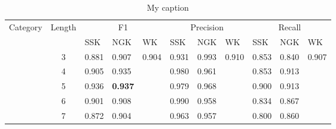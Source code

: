 \begin{table}[]
\centering
\caption{My caption}
\label{my-label}
\begin{tabular}{|c|c|l|l|l|l|l|l|l|l|l|}
\hline
Category                & Length                & \multicolumn{3}{c|}{F1}                                                                                                  & \multicolumn{3}{c|}{Precision} & \multicolumn{3}{c|}{Recall}                                                                   \\ \cline{3-11} 
\multicolumn{1}{|l|}{}  & \multicolumn{1}{l|}{} & SSK                                    & NGK                                    & WK                                     & SSK      & NGK      & WK       & SSK                           & NGK                           & WK                            \\ \hline
                        & 3                     & \cellcolor[HTML]{EFEFEF}0.881          & \cellcolor[HTML]{EFEFEF}0.907          & \cellcolor[HTML]{EFEFEF}0.904	   & 0.931    & 0.993    & 0.910    & \cellcolor[HTML]{EFEFEF}0.853 & \cellcolor[HTML]{EFEFEF}0.840 & \cellcolor[HTML]{EFEFEF}0.907 \\ \cline{2-11} 
                        & 4                     & \cellcolor[HTML]{EFEFEF}0.905          & \cellcolor[HTML]{EFEFEF}0.935          & \cellcolor[HTML]{EFEFEF}               & 0.980    & 0.961    &          & \cellcolor[HTML]{EFEFEF}0.853 & \cellcolor[HTML]{EFEFEF}0.913 & \cellcolor[HTML]{EFEFEF}      \\ \cline{2-11} 
                        & 5                     & \cellcolor[HTML]{EFEFEF}0.936          & \cellcolor[HTML]{EFEFEF}\textbf{0.937} & \cellcolor[HTML]{EFEFEF}               & 0.979    & 0.968    &          & \cellcolor[HTML]{EFEFEF}0.900 & \cellcolor[HTML]{EFEFEF}0.913 & \cellcolor[HTML]{EFEFEF}      \\ \cline{2-11} 
                        & 6                     & \cellcolor[HTML]{EFEFEF}0.901          & \cellcolor[HTML]{EFEFEF}0.908          & \cellcolor[HTML]{EFEFEF}               & 0.990    & 0.958    &          & \cellcolor[HTML]{EFEFEF}0.834 & \cellcolor[HTML]{EFEFEF}0.867 & \cellcolor[HTML]{EFEFEF}      \\ \cline{2-11} 
                        & 7                     & \cellcolor[HTML]{EFEFEF}0.872          & \cellcolor[HTML]{EFEFEF}0.904          & \cellcolor[HTML]{EFEFEF}               & 0.963    & 0.957    &          & \cellcolor[HTML]{EFEFEF}0.800 & \cellcolor[HTML]{EFEFEF}0.860 & \cellcolor[HTML]{EFEFEF}      \\ \cline{2-11} 

\end{tabular}
\end{table}

